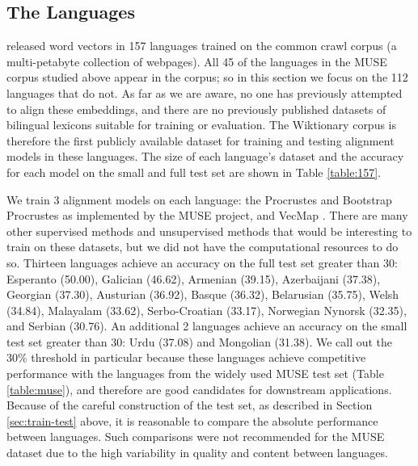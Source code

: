 \documentclass[11pt]{article}
\begin{document}
\subsection{The \citet{grave2018learning} Languages}
\label{sec:157}

\citet{grave2018learning} released word vectors in 157 languages trained on the common crawl corpus (a multi-petabyte collection of webpages).
All 45 of the languages in the MUSE corpus studied above appear in the \citet{grave2018learning} corpus;
so in this section we focus on the 112 languages that do not.
As far as we are aware, no one has previously attempted to align these embeddings,
and there are no previously published datasets of bilingual lexicons suitable for training or evaluation.
The Wiktionary corpus is therefore the first publicly available dataset for training and testing alignment models in these languages.
The size of each language's dataset and the accuracy for each model on the small and full test set are shown in Table \ref{table:157}.

We train 3 alignment models on each language:
the Procrustes \citep{xing2015normalized} and Bootstrap Procrustes \citep{glavas2019properly,vulic2019we} as implemented by the MUSE project, %
and VecMap \citep{artetxe2018generalizing}.
There are many other supervised methods and unsupervised methods that would be interesting to train on these datasets,
but we did not have the computational resources to do so.
Thirteen languages achieve an accuracy on the full test set greater than 30: Esperanto (50.00), Galician (46.62), Armenian (39.15), Azerbaijani (37.38), Georgian (37.30), Austurian (36.92), Basque (36.32), Belarusian (35.75), Welsh (34.84), Malayalam (33.62), Serbo-Croatian (33.17), Norwegian Nynorsk (32.35), and Serbian (30.76).
An additional 2 languages achieve an accuracy on the small test set greater than 30: Urdu (37.08) and Mongolian (31.38).
We call out the 30\% threshold in particular because these languages achieve competitive performance with the languages from the widely used MUSE test set (Table \ref{table:muse}),
and therefore are good candidates for downstream applications.
Because of the careful construction of the test set, as described in Section \ref{sec:train-test} above, it is reasonable to compare the absolute performance between languages.
Such comparisons were not recommended for the MUSE dataset \citep{kementchedjhieva2019lost} due to the high variability in quality and content between languages.
\end{document}
